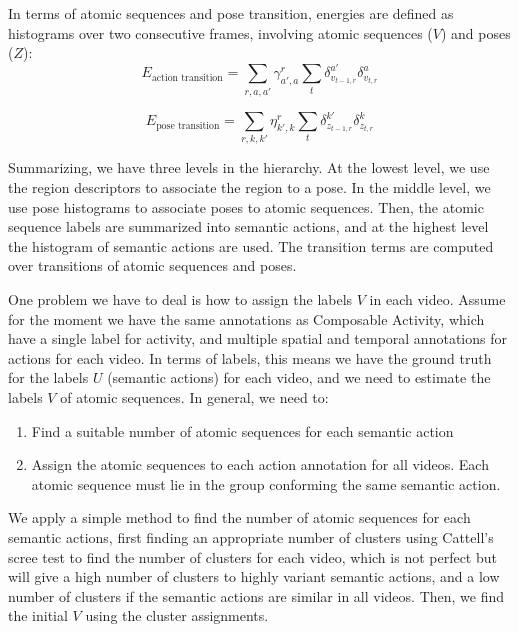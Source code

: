 \documentclass[10pt,letterpaper]{article}
\newcommand{\+}[1]{\ensuremath{{\boldsymbol #1}}}
\begin{document}
In terms of atomic sequences and pose transition, energies are defined
as histograms over two consecutive frames,
involving atomic sequences ($V$) and poses ($Z$):
\begin{equation}
E_{\text{action transition}} = \sum_{r,a,a'}  \gamma^r_{a',a} \sum_{t} \delta_{v_{t-1,r}}^{a'}\delta_{v_{t,r}}^a 
\end{equation}

\begin{equation}
E_{\text{pose transition}} =\sum_{r,k,k'}  \eta^r_{k',k}\sum_{t}\delta_{z_{t-1,r}}^{k'}\delta_{z_{t,r}}^{k}
\end{equation}

Summarizing, we have three levels in the hierarchy. At the lowest level, we use the region descriptors to associate the region to a pose. In the middle level, we use pose histograms to associate poses to atomic sequences. Then, the atomic sequence labels are summarized into semantic actions, and at the highest level the histogram of semantic actions are used. The transition terms are computed over transitions of atomic sequences and poses. 
 \vspace{1em}

One problem we have to deal is how to assign the labels $V$ in each video. Assume for the moment we have the same annotations as Composable Activity, which have a single label for activity, and multiple spatial and temporal annotations for actions for each video. In terms of labels, this means we have the ground truth for the labels $U$ (semantic actions) for each video, and we need to estimate the labels $V$ of atomic sequences.  In general, we need to:
\begin{enumerate}
\item Find a suitable number of atomic sequences for each semantic action
\item Assign the atomic sequences to each action annotation for all videos. Each atomic sequence must lie in the group conforming the same semantic action.
\end{enumerate}

We apply a simple method to find the number of atomic sequences for each semantic actions, first finding an appropriate number of clusters using Cattell's scree test to find the number of clusters for each video, which is not perfect but will give a high number of clusters to highly variant semantic actions, and a low number of clusters if the semantic actions are similar in all videos. Then, we find the initial $V$ using the cluster assignments. 
\end{document}

